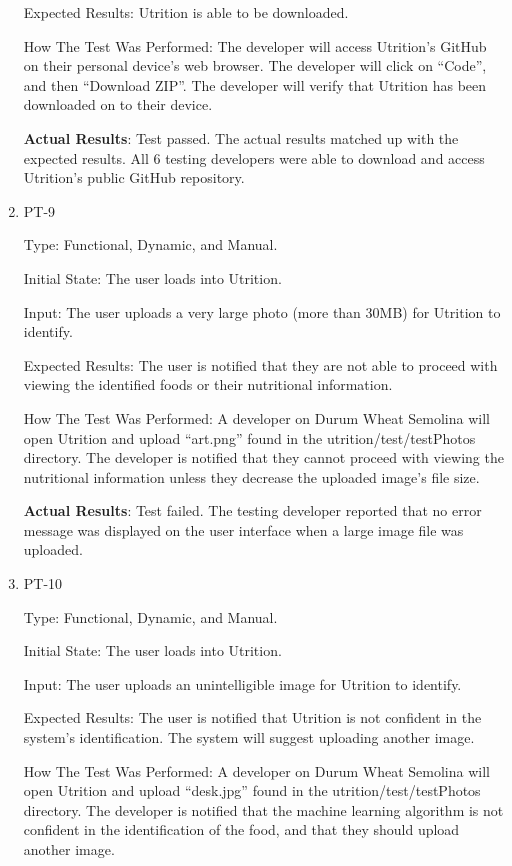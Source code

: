 \documentclass[12pt, titlepage]{article}
\begin{document}
\begin{enumerate}
		Expected Results: Utrition is able to be downloaded.
		
		How The Test Was Performed: The developer will access Utrition’s GitHub on their personal device’s web browser. The developer will click on “Code”, and then “Download ZIP”. The developer will verify that Utrition has been downloaded on to their device.
		
		\textbf{Actual Results}: Test passed. The actual results matched up with the expected results. All 6 testing developers were able to download and access Utrition's public GitHub repository.
		
		\item{PT-9} 
		
		Type: Functional, Dynamic, and Manual.
		
		Initial State: The user loads into Utrition.
		
		Input: The user uploads a very large photo (more than 30MB) for Utrition to identify.
		
		Expected Results: The user is notified that they are not able to proceed with viewing the identified foods or their nutritional information.
		
		How The Test Was Performed: A developer on Durum Wheat Semolina will open Utrition and upload “art.png” found in the utrition/test/testPhotos directory. The developer is notified that they cannot proceed with viewing the nutritional information unless they decrease the uploaded image’s file size.
		
		\textbf{Actual Results}: Test failed. The testing developer reported that no error message was displayed on the user interface when a large image file was uploaded.
		
		\item{PT-10} 
		
		Type: Functional, Dynamic, and Manual.
		
		Initial State: The user loads into Utrition.
		
		Input: The user uploads an unintelligible image for Utrition to identify.
		
		Expected Results: The user is notified that Utrition is not confident in the system’s identification. The system will suggest uploading another image.
		
		How The Test Was Performed: A developer on Durum Wheat Semolina will 
		open Utrition and upload “desk.jpg” found in the utrition/test/testPhotos directory. The developer 
		is notified that the machine learning algorithm is not confident in the 
		identification of the food, and that they should upload another image.
		

\end{enumerate}
\end{document}
